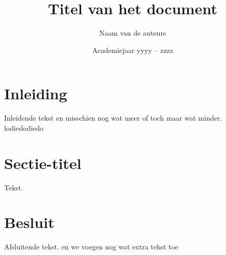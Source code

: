 \documentclass[a4paper,kulak]{kulakarticle} %
\date{Academiejaar yyyy -- zzzz}
\title{Titel van het document}
\author{Naam van de auteurs}
\begin{document}
\maketitle

\section*{Inleiding}

Inleidende tekst en misschien nog wat meer of toch maar wat minder.
lodiedodiedo

\section{Sectie-titel}

Tekst.

\section*{Besluit}

Afsluitende tekst.
en we voegen nog wat extra tekst toe
\end{document}
